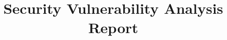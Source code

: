 \documentclass{orizon-recon-report-style}
\begin{document}
\frontmatter

\title{Security Vulnerability Analysis Report}
\reportdate{\monthname{} \the\year}

\makecover



\mainmatter
\begin{multicols}{2}

\tableofcontents

\clearpage %



\end{multicols}

\clearpage %

\makebackcover
\end{document}
